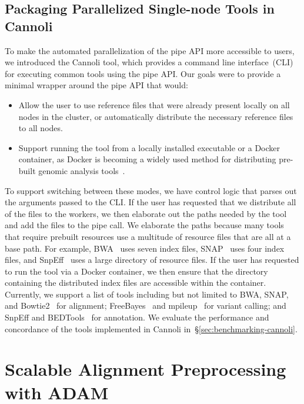 \documentclass[phd]{ucbthesis}
\begin{document}
\section{Packaging Parallelized Single-node Tools in {Cannoli}}
\label{sec:parallelizing-in-cannoli}

To make the automated parallelization of the {pipe} API more accessible
to users, we introduced the {Cannoli} tool, which provides a command line
interface~(CLI) for executing common tools using the {pipe} API. Our
goals were to provide a minimal wrapper around the {pipe} API that would:

\begin{itemize}
\item Allow the user to use reference files that were already present locally on
  all nodes in the cluster, or automatically distribute the necessary reference
  files to all nodes.
\item Support running the tool from a locally installed executable or a
  {Docker} container, as {Docker} is becoming a widely used method
  for distributing pre-built genomic analysis tools~\cite{vivian17}.
\end{itemize}

To support switching between these modes, we have control logic that parses out the arguments passed to
the CLI. If the user has requested that we distribute all of the files to the
workers, we then elaborate out the paths needed by the tool and add the files
to the {pipe} call. We elaborate the paths because many tools that require prebuilt
resources use a multitude of resource files that are all at a base path. For
example, BWA~\cite{li09bwa} uses seven index files, SNAP~\cite{zaharia11} uses
four index files, and {SnpEff}~\cite{cingolani12} uses a large directory of
resource files. If the user has requested to run the tool via a {Docker}
container, we then ensure that the directory containing the distributed
index files are accessible within the container. Currently, we support a list of
tools including but not limited to BWA, SNAP, and
{Bowtie2}~\cite{langmead09bowtie} for alignment;
{FreeBayes}~\cite{garrison12} and {mpileup}~\cite{li11} for
variant calling; and {SnpEff} and {BEDTools}~\cite{quinlan10} for
annotation. We evaluate the performance and concordance of the tools implemented
in {Cannoli} in~\S\ref{sec:benchmarking-cannoli}.

\chapter{Scalable Alignment Preprocessing with {ADAM}}
\label{chap:adam}
\end{document}
